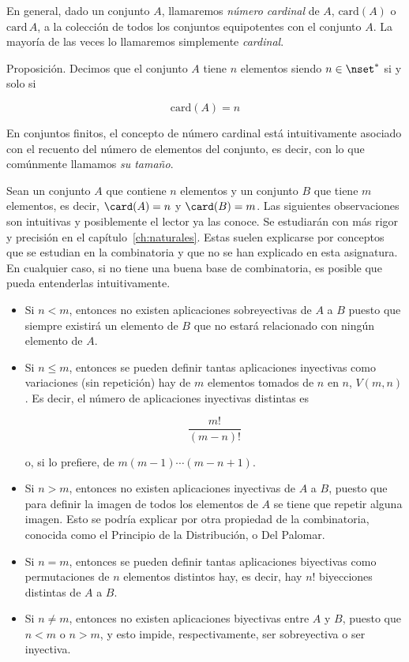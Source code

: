 

En general, dado un conjunto $A$, llamaremos \emph{número cardinal} de $A$,
$\text{card}(A)$ o $\text{card} \, A$, a la colección de todos los conjuntos
equipotentes con el conjunto $A$. La mayoría de las veces lo llamaremos
simplemente \emph{cardinal}.

Proposición. Decimos que el conjunto $A$ tiene $n$ elementos siendo $n \in
\nset^*$ si y solo si

$$ \text{card}(A) = n $$

En conjuntos finitos, el concepto de número cardinal está intuitivamente
asociado con el recuento del número de elementos del conjunto, es decir, con
lo que comúnmente llamamos \emph{su tamaño}.

Sean un conjunto $A$ que contiene $n$ elementos y un conjunto $B$ que tiene
$m$ elementos, es decir, $\card(A) = n$ y $\card(B) = m$. Las siguientes
observaciones son intuitivas y posiblemente el lector ya las conoce. Se
estudiarán con más rigor y precisión en el capítulo~\ref{ch:naturales}.
Estas suelen explicarse por conceptos que se estudian en la combinatoria y
que no se han explicado en esta asignatura. En cualquier caso, si no tiene
una buena base de combinatoria, es posible que pueda entenderlas
intuitivamente.

\begin{itemize}
  \item Si $n < m$, entonces no existen aplicaciones sobreyectivas de $A$ a
    $B$ puesto que siempre existirá un elemento de $B$ que no estará
    relacionado con ningún elemento de $A$.

  \item Si $n \leq m$, entonces se pueden definir tantas aplicaciones
    inyectivas como variaciones \footnotemark (sin repetición) hay de $m$
    elementos tomados de $n$ en $n$, $V(m, n)$. Es decir, el número de
    aplicaciones inyectivas distintas es

    $$ \frac{m!}{(m-n)!} $$

    \noindent o, si lo prefiere, de $m(m-1) \cdots (m-n+1)$.

  \item Si $n > m$, entonces no existen aplicaciones inyectivas de $A$ a
    $B$, puesto que para definir la imagen de todos los elementos de $A$ se
    tiene que repetir alguna imagen. Esto se podría explicar por otra
    propiedad de la combinatoria, conocida como el Principio de la
    Distribución, o Del Palomar.

  \item Si $n = m$, entonces se pueden definir tantas aplicaciones
    biyectivas como permutaciones de $n$ elementos distintos hay, es decir,
    hay $n!$ biyecciones distintas de $A$ a $B$.

  \item Si $n \neq m$, entonces no existen aplicaciones biyectivas entre $A$
    y $B$, puesto que $n < m$ o $n > m$, y esto impide, respectivamente, ser
    sobreyectiva o ser inyectiva.
\end{itemize}

